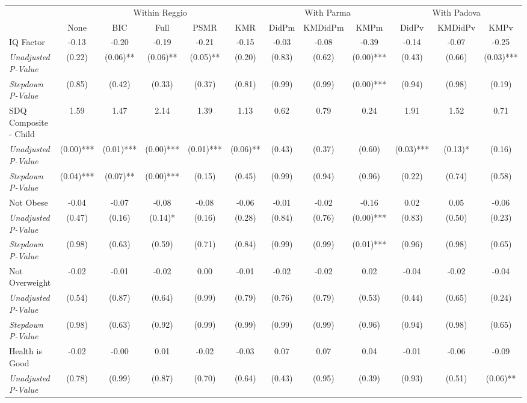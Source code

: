 \begin{tabular}{l c c c c c c c c c c c}
\toprule
& \multicolumn{5}{c}{Within Reggio} & \multicolumn{3}{c}{With Parma} & \multicolumn{3}{c}{With Padova} \\\cmidrule(lr){2-6} \cmidrule(lr){7-9} \cmidrule(lr){10-12}
 & None & BIC & Full & PSMR & KMR & DidPm & KMDidPm & KMPm & DidPv & KMDidPv & KMPv \\
\midrule
IQ Factor & -0.13 & -0.20 & -0.19 & -0.21 & -0.15 & -0.03 & -0.08 & -0.39 & -0.14 & -0.07 & -0.25 \\
\quad \textit{Unadjusted P-Value} & (0.22) & (0.06)** & (0.06)** & (0.05)** & (0.20) & (0.83) & (0.62) & (0.00)*** & (0.43) & (0.66) & (0.03)*** \\
\quad \textit{Stepdown P-Value} & (0.85) & (0.42) & (0.33) & (0.37) & (0.81) & (0.99) & (0.99) & (0.00)*** & (0.94) & (0.98) & (0.19) \\
SDQ Composite - Child & 1.59 & 1.47 & 2.14 & 1.39 & 1.13 & 0.62 & 0.79 & 0.24 & 1.91 & 1.52 & 0.71 \\
\quad \textit{Unadjusted P-Value} & (0.00)*** & (0.01)*** & (0.00)*** & (0.01)*** & (0.06)** & (0.43) & (0.37) & (0.60) & (0.03)*** & (0.13)* & (0.16) \\
\quad \textit{Stepdown P-Value} & (0.04)*** & (0.07)** & (0.00)*** & (0.15) & (0.45) & (0.99) & (0.94) & (0.96) & (0.22) & (0.74) & (0.58) \\
Not Obese & -0.04 & -0.07 & -0.08 & -0.08 & -0.06 & -0.01 & -0.02 & -0.16 & 0.02 & 0.05 & -0.06 \\
\quad \textit{Unadjusted P-Value} & (0.47) & (0.16) & (0.14)* & (0.16) & (0.28) & (0.84) & (0.76) & (0.00)*** & (0.83) & (0.50) & (0.23) \\
\quad \textit{Stepdown P-Value} & (0.98) & (0.63) & (0.59) & (0.71) & (0.84) & (0.99) & (0.99) & (0.01)*** & (0.96) & (0.98) & (0.65) \\
Not Overweight & -0.02 & -0.01 & -0.02 & 0.00 & -0.01 & -0.02 & -0.02 & 0.02 & -0.04 & -0.02 & -0.04 \\
\quad \textit{Unadjusted P-Value} & (0.54) & (0.87) & (0.64) & (0.99) & (0.79) & (0.76) & (0.79) & (0.53) & (0.44) & (0.65) & (0.24) \\
\quad \textit{Stepdown P-Value} & (0.98) & (0.63) & (0.92) & (0.99) & (0.99) & (0.99) & (0.99) & (0.96) & (0.94) & (0.98) & (0.65) \\
Health is Good & -0.02 & -0.00 & 0.01 & -0.02 & -0.03 & 0.07 & 0.07 & 0.04 & -0.01 & -0.06 & -0.09 \\
\quad \textit{Unadjusted P-Value} & (0.78) & (0.99) & (0.87) & (0.70) & (0.64) & (0.43) & (0.95) & (0.39) & (0.93) & (0.51) & (0.06)** \\

\end{tabular}
